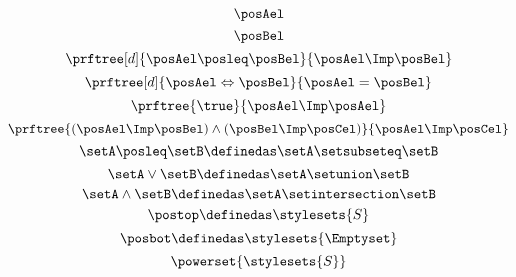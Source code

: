 {\begin{forslides}
\begin{equation}
            \label{eq:latt_4}
            \posAel
        \end{equation}
        \begin{equation}
            \label{eq:latt_5}
            \posBel
        \end{equation}
        \begin{equation}
            \label{eq:prop_1}
            \prftree[d]{\posAel \posleq \posBel}{\posAel \Imp \posBel}
        \end{equation}
        \begin{equation}
            \label{eq:prop_2}
            \prftree[d]{\posAel \Leftrightarrow \posBel}{\posAel = \posBel}
        \end{equation}
        \begin{equation}
            \label{eq:prop_3}
            \prftree{\true}{\posAel \Imp \posAel}
        \end{equation}
        \begin{equation}
            \label{eq:prop_4}
            \prftree{(\posAel \Imp \posBel)\wedge (\posBel \Imp \posCel)}{\posAel \Imp \posCel}
        \end{equation}
        \begin{equation}
            \label{eq:pow_1}
            \setA \posleq \setB \definedas \setA \setsubseteq \setB
        \end{equation}
        \begin{equation}
            \label{eq:pow_2}
            \setA \vee \setB \definedas \setA \setunion \setB
        \end{equation}
        \begin{equation}
            \label{eq:pow_3}
            \setA \wedge \setB \definedas \setA \setintersection \setB
        \end{equation}
        \begin{equation}
            \label{eq:pow_4}
            \postop \definedas \stylesets{S}
        \end{equation}
        \begin{equation}
            \label{eq:pow_5}
            \posbot \definedas \stylesets{\Emptyset}
        \end{equation}
        \begin{equation}
            \label{eq:pow_6}
            \powerset{\stylesets{S}}
        \end{equation}
        \begin{equation}

\end{equation}
\end{forslides}}
